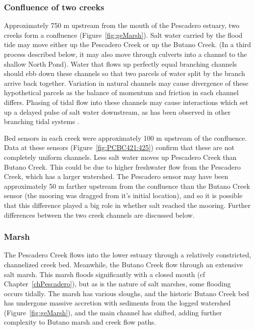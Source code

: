 \subsubsection{Confluence of two creeks}
Approximately 750 m upstream from the mouth of the Pescadero estuary, two creeks form a confluence (Figure~\ref{fig:geMarsh}). Salt water carried by the flood tide may move either up the Pescadero Creek or up the Butano Creek. (In a third process described below, it may also move through culverts into a channel to the shallow North Pond). Water that flows up perfectly equal branching channels should ebb down these channels so that two parcels of water split by the branch arrive back together. Variation in natural channels may cause divergence of these hypothetical parcels as the balance of momentum and friction in each channel differs. Phasing of tidal flow into these channels may cause interactions which set up a delayed pulse of salt water downstream, as has been observed in other branching tidal systems \parencite{macvean_estuarine_2011}.

Bed sensors in each creek were approximately 100 m upstream of the confluence. Data at these sensors (Figure~\ref{fig:PCBC421:425}) confirm that these are not completely uniform channels. Less salt water moves up Pescadero Creek than Butano Creek. This could be due to higher freshwater flow from the Pescadero Creek, which has a larger watershed. The Pescadero sensor may have been approximately 50 m farther upstream from the confluence than the Butano Creek sensor (the mooring was dragged from it's initial location), and so it is possible that this difference played a big role in whether salt reached the mooring. Further differences between the two creek channels are discussed below.

\subsubsection{Marsh}
The Pescadero Creek flows into the lower estuary through a relatively constricted, channelized creek bed.  Meanwhile, the Butano Creek flow through an extensive salt marsh. This marsh floods significantly with a closed mouth (cf Chapter~\ref{chPescadero}), but as is the nature of salt marshes, some flooding occurs tidally. The marsh has various sloughs, and the historic Butano Creek bed has undergone massive accretion with sediments from the logged watershed (Figure~\ref{fig:geMarsh}), and the main channel has shifted, adding further complexity to Butano marsh and creek flow paths.

